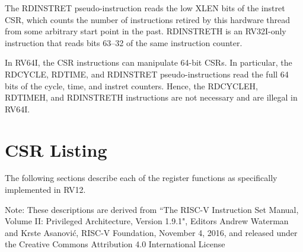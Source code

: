 The RDINSTRET pseudo-instruction reads the low XLEN bits of the instret
CSR, which counts the number of instructions retired by this hardware
thread from some arbitrary start point in the past. RDINSTRETH is an
RV32I-only instruction that reads bits 63--32 of the same instruction
counter.

In RV64I, the CSR instructions can manipulate 64-bit CSRs. In
particular, the RDCYCLE, RDTIME, and RDINSTRET pseudo-instructions read
the full 64 bits of the cycle, time, and instret counters. Hence, the
RDCYCLEH, RDTIMEH, and RDINSTRETH instructions are not necessary and are
illegal in RV64I.

\section{CSR Listing}\label{csr-listing}

The following sections describe each of the register functions as
specifically implemented in RV12.

Note: These descriptions are derived from ``The RISC-V Instruction Set
Manual, Volume II: Privileged Architecture, Version 1.9.1", Editors
Andrew Waterman and Krste Asanović, RISC-V Foundation, November 4, 2016,
and released under the Creative Commons Attribution 4.0 International
License


